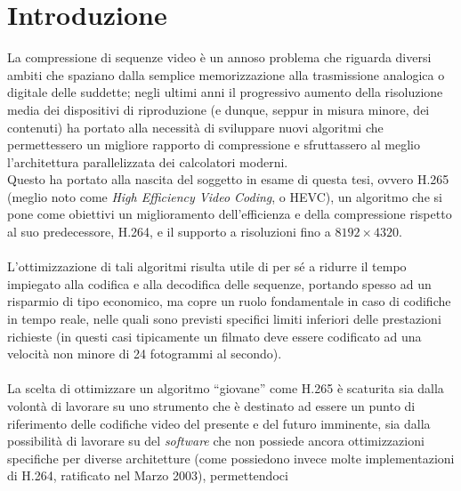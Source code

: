 
\chapter{Introduzione} %

\label{Chapter1}



La compressione di sequenze video è un annoso problema che riguarda diversi
ambiti che spaziano dalla semplice memorizzazione alla trasmissione analogica
o digitale delle suddette; negli ultimi anni il progressivo aumento
della risoluzione media dei dispositivi di riproduzione (e dunque, seppur in
misura minore, dei contenuti) ha portato alla necessità di sviluppare nuovi
algoritmi che permettessero un migliore rapporto di compressione e sfruttassero
al meglio l'architettura parallelizzata dei calcolatori moderni. \\
Questo ha portato alla nascita del soggetto in esame di questa tesi, ovvero
H.265 (meglio noto come \emph{High Efficiency Video Coding}, o HEVC), un 
algoritmo che si pone come obiettivi un miglioramento dell'efficienza e
della compressione rispetto al suo predecessore, H.264, e il supporto a
risoluzioni fino a $8192{\times}4320$\citep{OverHEVC}. 
\\ \\
L'ottimizzazione di tali algoritmi risulta utile di per sé a ridurre il tempo
impiegato alla codifica e alla decodifica delle sequenze, portando spesso ad
un risparmio di tipo economico, ma copre un ruolo fondamentale in caso di
codifiche in tempo reale, nelle quali sono previsti specifici limiti inferiori
delle prestazioni richieste (in questi casi tipicamente un filmato deve essere 
codificato ad una velocità non minore di 24 fotogrammi al secondo). 
\\ \\
La scelta di ottimizzare un algoritmo ``giovane'' come H.265 è scaturita sia
dalla volontà di lavorare su uno strumento che è destinato ad essere un punto
di riferimento delle codifiche video del presente e del futuro imminente, sia
dalla possibilità di lavorare su del \emph{software} che non possiede ancora
ottimizzazioni specifiche per diverse architetture (come possiedono invece
molte implementazioni di H.264, ratificato nel Marzo 2003), permettendoci
